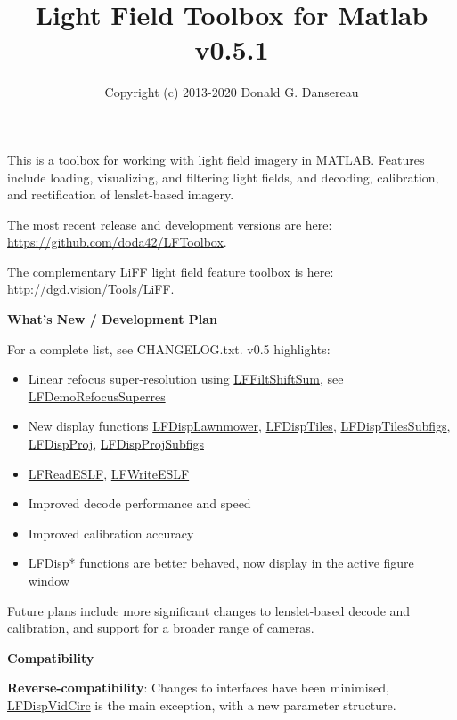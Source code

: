 \documentclass[onecolumn]{article}
\title{
Light Field Toolbox for Matlab\\
{\large v0.5.1}
}
\author{Copyright (c) 2013-2020 Donald G. Dansereau}
\date{}
\newcommand{\CiteFunc}[1]{\hyperlink{#1}{\small #1}}
\begin{document}
\maketitle
\thispagestyle{empty}\pagestyle{plain}

This is a toolbox for working with light field imagery in MATLAB. Features include loading, visualizing, and filtering light fields, and decoding, calibration, and rectification of lenslet-based imagery.

The most recent release and development versions are here: \url{https://github.com/doda42/LFToolbox}. 

The complementary LiFF light field feature toolbox is here: \url{http://dgd.vision/Tools/LiFF}.

\vspace{1em}\noindent\textbf{\large{What's New  / Development Plan}}\vspace{0.5em}

For a complete list, see CHANGELOG.txt. v0.5 highlights:
\begin{itemize}[leftmargin=2.8em,itemsep=0em,rightmargin=0.5cm]
\item Linear refocus super-resolution using \CiteFunc{LFFiltShiftSum}, see \CiteFunc{LFDemoRefocusSuperres}
\item New display functions \CiteFunc{LFDispLawnmower}, \CiteFunc{LFDispTiles}, \CiteFunc{LFDispTilesSubfigs}, \CiteFunc{LFDispProj}, \CiteFunc{LFDispProjSubfigs}
\item \CiteFunc{LFReadESLF}, \CiteFunc{LFWriteESLF}
\item Improved decode performance and speed
\item Improved calibration accuracy
\item LFDisp* functions are better behaved, now display in the active figure window
\end{itemize}


Future plans include more significant changes to lenslet-based decode and calibration, and support for a broader range of cameras.

\vspace{1em}\noindent\textbf{\large{Compatibility}}\vspace{0.5em}

\textbf{Reverse-compatibility}: Changes to interfaces have been minimised, \CiteFunc{LFDispVidCirc} is the main exception, with a new parameter structure.
\end{document}
